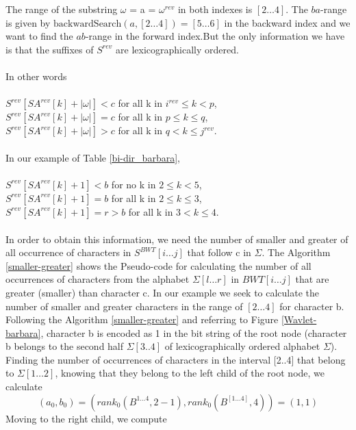 \documentclass[11pt,a4paper]{report}
\begin{document}
The range of the substring   
$\omega$ = a = $\omega^{rev}$ in both indexes is $[2\ldots 4]$.
The $ba$-range is given by $\mbox{backwardSearch}(a,[2\ldots 4])=[5\ldots 6]$
in the backward index and we want to find the $ab$-range in
the forward index.But the only information we have is that 
the suffixes of $S^{rev}$ are lexicographically ordered. \\\\
In other words \cite{bidirectional}\\\\
$S^{rev}[SA^{rev}[k]+|\omega|] < c$ for all k in $i^{rev}  \leq k  < p$,\\
$S^{rev}[SA^{rev}[k]+|\omega|] = c$ for all k in  $p  \leq  k  \leq  q $,\\
$S^{rev}[SA^{rev}[k]+|\omega|] > c$ for all k in  $q <   k \leq   j^{rev}$.\\\\
In our example of Table \ref{bi-dir_barbara},\\\\
$S^{rev}[SA^{rev}[k]+1] < b $ for no  k in $ 2 \leq k  < 5 $,\\
$S^{rev}[SA^{rev}[k]+1] = b $ for all k in $ 2  \leq  k  \leq  3 $,\\
$S^{rev}[SA^{rev}[k]+1] = r > b $ for all k in $ 3   < k  \leq  4 $.\\\\
In order to obtain this information, we need the number of smaller
and greater of all occurrence of characters in $S^{BWT}[i\ldots j]$ 
that follow c in $\Sigma$. The Algorithm \ref{smaller-greater} 
shows  the Pseudo-code for calculating the number of all occurrences 
of characters from the alphabet $\Sigma[l\ldots r]$ in $BWT[i\ldots j]$ that 
are greater (smaller) than character c. In our example 
we seek to calculate the number of smaller and greater 
characters in the range of $[2\ldots 4]$ for character b.  
Following the Algorithm \ref{smaller-greater} \cite{bidirectional} 
and referring to Figure \ref{Wavlet-barbara}, character
b is encoded as 1 in the bit string of the root node (character b belongs 
to the second half $\Sigma[3..4]$ of lexicographically ordered 
alphabet $\Sigma$).
Finding the number of occurrences of characters 
in the interval [2..4] that belong to $\Sigma[1\ldots 2]$, knowing that 
they belong to the left child of the root node, we calculate\\
$$(a_{0}, b_{0})=(rank_{0} ( B^{1\ldots 4} ,  2-1), rank_{0} (B^[1\ldots 4] , 4)) = (1 , 1) $$
Moving to the right child, we compute
\end{document}
